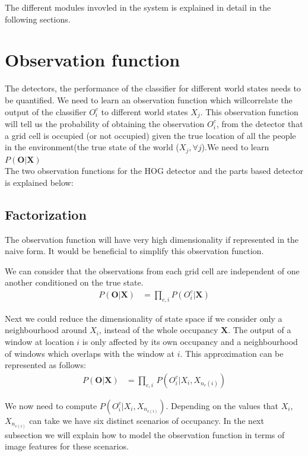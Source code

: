 \documentclass[10pt,twocolumn,letterpaper]{article}
\newcommand{\obs}{\mathbf{O}}
\newcommand{\state}{\mathbf{X}}
\begin{document}
The different modules invovled in the system is explained in detail in the following sections.

\section{Observation function}
The detectors, the performance of the classifier for different world states needs
to be quantified. We need to learn an observation function which willcorrelate the output of the classifier $O^{c}_{i}$ to different world
states $X_{j}$.
This observation function will tell us the probability of
obtaining the observation $ O^{c}_{i} $, from the detector that a grid cell is occupied (or not occupied) given the true location of all the people in the environment(the true state of the world ($ X_{j},\forall j $).We need to learn $ P(\textbf{O}|\textbf{X})  $\\

The two observation functions for the HOG detector and the parts based detector is explained below:

\subsection{Factorization}

The observation function will have very high dimensionality if represented in the naive form. It would be beneficial to simplify this observation function.

We can consider that the observations from each grid cell are independent of one another conditioned on the true state.
\begin{align}
P(\textbf{O}|\textbf{X})&=\prod_{c,i} {P(O_{i}^{c}|\textbf{X})}
\end{align}

Next we could reduce the dimensionality of state space if we consider only a neighbourhood around $ X_{i} $, instead of the whole occupancy $\textbf{X} $. The output of a window at location $ i $ is only affected by its own occupancy and a neighbourhood of windows which overlaps with the window at $ i$. This approximation can be represented as follows:\\ 

\begin{align}
  P(\obs|\state) &= \prod_{c,i} \, P(O_{i}^{c}|X_{i},X_{n_{c}(i)})
\end{align}

We now need to compute  $ P(O_{i}^{c}|X_{i},X_{n_{c(i)}}) $. Depending on the values that $ X_{i} $, $ X_{n_{c(i)}} $ can take we have six distinct scenarios of occupancy. In the next subsection we will explain how to model the observation function in terms of image features for these scenarios.    \\
\end{document}
